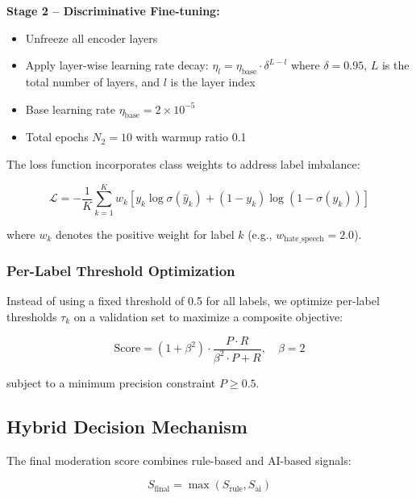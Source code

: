 \documentclass[12pt,a4paper]{article}
\begin{document}
\textbf{Stage 2 -- Discriminative Fine-tuning:}
\begin{itemize}[leftmargin=*]
    \item Unfreeze all encoder layers
    \item Apply layer-wise learning rate decay: $\eta_l = \eta_{\text{base}} \cdot \delta^{L-l}$ where $\delta = 0.95$, $L$ is the total number of layers, and $l$ is the layer index
    \item Base learning rate $\eta_{\text{base}} = 2 \times 10^{-5}$
    \item Total epochs $N_2 = 10$ with warmup ratio 0.1
\end{itemize}

The loss function incorporates class weights to address label imbalance:

\begin{equation}
    \mathcal{L} = -\frac{1}{K} \sum_{k=1}^{K} w_k \left[ y_k \log \sigma(\hat{y}_k) + (1-y_k) \log(1-\sigma(\hat{y}_k)) \right]
    \label{eq:loss}
\end{equation}

where $w_k$ denotes the positive weight for label $k$ (e.g., $w_{\text{hate\_speech}} = 2.0$).

\subsubsection{Per-Label Threshold Optimization}
Instead of using a fixed threshold of 0.5 for all labels, we optimize per-label thresholds $\tau_k$ on a validation set to maximize a composite objective:

\begin{equation}
    \text{Score} = (1+\beta^2) \cdot \frac{P \cdot R}{\beta^2 \cdot P + R}, \quad \beta = 2
    \label{eq:f2}
\end{equation}

subject to a minimum precision constraint $P \geq 0.5$.

\subsection{Hybrid Decision Mechanism}

The final moderation score combines rule-based and AI-based signals:

\begin{equation}
    S_{\text{final}} = \max(S_{\text{rule}}, S_{\text{ai}})
    \label{eq:hybrid}
\end{equation}
\end{document}
